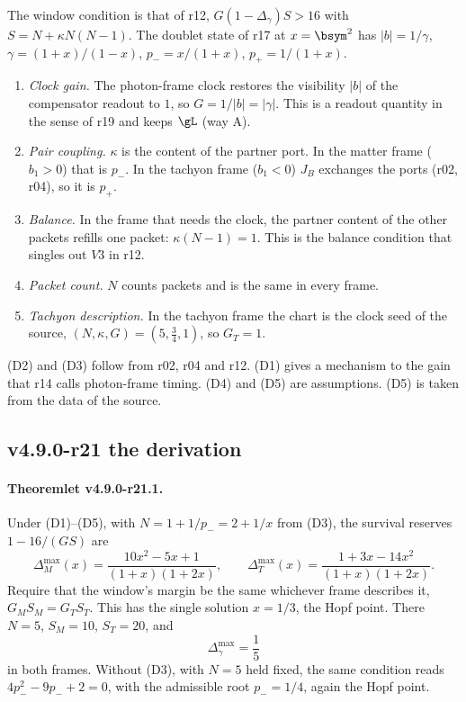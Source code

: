 The window condition is that of r12, \(G(1-\Delta_\gamma)S>16\) with \(S=N+\kappa N(N-1)\).  The doublet state of r17 at
\(x=\bsym^2\) has \(|b|=1/\gamma\), \(\gamma=(1+x)/(1-x)\), \(p_-=x/(1+x)\), \(p_+=1/(1+x)\).
\begin{enumerate}[leftmargin=2em]
\item[(D1)] \emph{Clock gain.}  The photon-frame clock restores the visibility \(|b|\) of the compensator readout to \(1\), so
\(G=1/|b|=|\gamma|\).  This is a readout quantity in the sense of r19 and keeps \(\gL\) (way A).
\item[(D2)] \emph{Pair coupling.}  \(\kappa\) is the content of the partner port.  In the matter frame (\(b_1>0\)) that is \(p_-\).  In
the tachyon frame (\(b_1<0\)) \(J_B\) exchanges the ports (r02, r04), so it is \(p_+\).
\item[(D3)] \emph{Balance.}  In the frame that needs the clock, the partner content of the other packets refills one packet:
\(\kappa(N-1)=1\).  This is the balance condition that singles out \(V3\) in r12.
\item[(D4)] \emph{Packet count.}  \(N\) counts packets and is the same in every frame.
\item[(D5)] \emph{Tachyon description.}  In the tachyon frame the chart is the clock seed of the source,
\((N,\kappa,G)=(5,\tfrac34,1)\), so \(G_T=1\).
\end{enumerate}
(D2) and (D3) follow from r02, r04 and r12.  (D1) gives a mechanism to the gain that r14 calls photon-frame timing.  (D4) and
(D5) are assumptions.  (D5) is taken from the data of the source.

\subsection*{v4.9.0-r21 the derivation}
\label{subsec:v490-r21-derivation}

\paragraph{Theoremlet v4.9.0-r21.1.}
Under (D1)--(D5), with \(N=1+1/p_-=2+1/x\) from (D3), the survival reserves \(1-16/(GS)\) are
\[
\Delta_M^{\max}(x)=\frac{10x^2-5x+1}{(1+x)(1+2x)},\qquad
\Delta_T^{\max}(x)=\frac{1+3x-14x^2}{(1+x)(1+2x)} .
\]
Require that the window's margin be the same whichever frame describes it, \(G_MS_M=G_TS_T\).  This has the single solution
\(x=1/3\), the Hopf point.  There \(N=5\), \(S_M=10\), \(S_T=20\), and
\[
\Delta_\gamma^{\max}=\frac15
\]
in both frames.  Without (D3), with \(N=5\) held fixed, the same condition reads \(4p_-^2-9p_-+2=0\), with the admissible root
\(p_-=1/4\), again the Hopf point.

